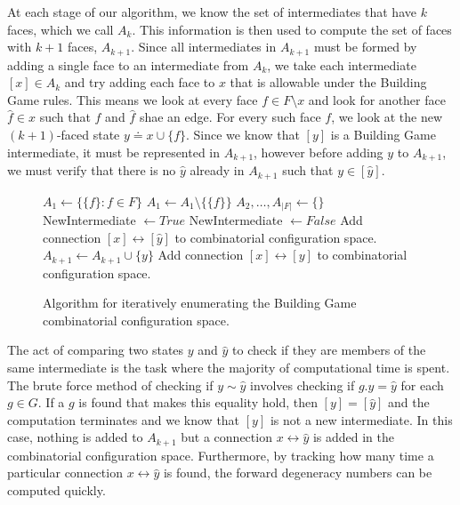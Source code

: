 At each stage of our algorithm, we know the set of intermediates that have $k$ faces, which we call $A_k$. This information is then used to compute the set of faces with $k+1$ faces, $A_{k+1}$. Since all intermediates in $A_{k+1}$ must be formed by adding a single face to an intermediate from $A_k$, we take each intermediate $[x] \in A_k$ and try adding each face to $x$ that is allowable under the Building Game rules. This means we look at every face $f \in F\setminus x$ and look for another face  $\hat{f} \in x$ such that $f$ and $\hat{f}$ shae an edge. For every such face $f$, we look at the new $(k+1)$-faced state $y \doteq x\cup \{f\}$. Since we know that $[y]$ is a Building Game intermediate, it must be represented in $A_{k+1}$, however before adding $y$ to $A_{k+1}$, we must verify that there is no $\hat{y}$ already in $A_{k+1}$ such that $y \in [\hat{y}]$.

\begin{figure}[ht]
\centering
\begin{algorithmic}
  \State $A_1\gets \{\{f\} : f \in F\}$ 
  \State $A_1 \gets A_1 \setminus \{\{f\}\}$
  \EndIf
  \EndFor
  \State $A_2, \dots, A_{|F|} \gets \{\}$ 
  \State NewIntermediate $\gets True$
  \State NewIntermediate $\gets False$
  \State Add connection $[x] \leftrightarrow [\hat{y}]$ to combinatorial configuration space.
  \EndIf
  \EndFor
  \State $A_{k+1} \gets A_{k+1} \cup \{y\}$
  \State Add connection $[x] \leftrightarrow [y]$ to combinatorial configuration space.
  \EndIf
  \EndFor
  \EndFor
  \EndFor
\end{algorithmic}
\caption{Algorithm for iteratively enumerating the Building Game combinatorial configuration space.}
\label{alg:CCS}
\end{figure}

The act of comparing two states $y$ and $\hat{y}$ to check if they are members of the same intermediate is the task where the majority of computational time is spent. The brute force method of checking if $y \sim \hat{y}$ involves checking if $g.y = \hat{y}$ for each $g \in G$. If a $g$ is found that makes this equality hold, then $[y] = [ \hat{y}]$ and the computation terminates and we know that $[y]$ is not a new intermediate. In this case, nothing is added to $A_{k+1}$ but a connection $x \leftrightarrow \hat{y}$ is added in the combinatorial configuration space. Furthermore, by tracking how many time a particular connection $x \leftrightarrow \hat{y}$ is found, the forward degeneracy numbers can be computed quickly. 

